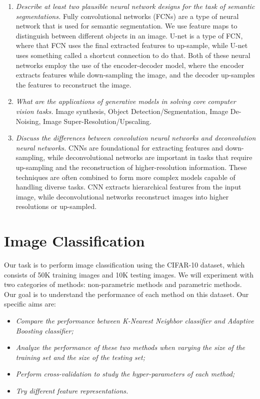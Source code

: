 \documentclass[11pt]{article}
\begin{document}
\begin{enumerate}
        \item \textit{Describe at least two plausible neural network designs for the task of semantic segmentations.}\newline
        Fully convolutional networks (FCNs) are a type of neural network that is used for semantic segmentation. We
        use feature maps to distinguish between different objects in an image.
        U-net is a type of FCN, where that FCN uses the final extracted features to up-sample, while U-net uses
        something called a shortcut connection to do that.
        Both of these neural networks employ the use of the encoder-decoder model, where the encoder extracts features
        while down-sampling the image, and the decoder up-samples the features to reconstruct the image.

        \item \textit{What are the applications of generative models in solving core computer vision tasks.}\newline
        Image synthesis, Object Detection/Segmentation, Image De-Noising, Image Super-Resolution/Upscaling.

        \item \textit{Discuss the differences between convolution neural networks and deconvolution neural networks.}\newline
        CNNs are foundational for extracting features and down-sampling, while deconvolutional networks are
        important in tasks that require up-sampling and the reconstruction of higher-resolution information.
        These techniques are often combined to form more complex models capable of handling diverse tasks.
        CNN extracts hierarchical features from the input image, while deconvolutional networks reconstruct images
        into higher resolutions or up-sampled.
    \end{enumerate}


    \section{Image Classification}

    Our task is to perform image classification using the CIFAR-10 dataset, which consists of 50K training images and
    10K testing images. We will experiment with two categories of methods: non-parametric methods and parametric
    methods.
    Our goal is to understand the performance of each method on this dataset. Our specific aims are:
    \begin{itemize}
        \item \textit{Compare the performance between K-Nearest Neighbor classifier and Adaptive Boosting classifier;}
        \item \textit{Analyze the performance of these two methods when varying the size of the training set
        and the size of the testing set;}
        \item \textit{Perform cross-validation to study the hyper-parameters of each method;}
        \item \textit{Try different feature representations.}
    \end{itemize}
\end{document}
